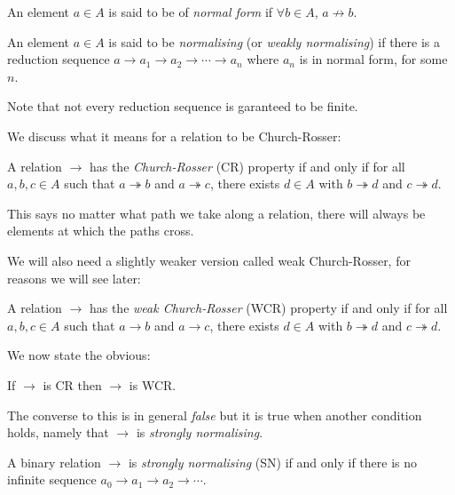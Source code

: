 \begin{defin}
    An element $a \in A$ is said to be of \emph{normal form} if $\forall b \in A$, $a {\not \to} b$.
\end{defin}

\begin{defin}
    An element $a \in A$ is said to be \emph{normalising} (or \emph{weakly normalising}) if there is a reduction sequence $a \to a_1 \to a_2 \to \cdots \to a_n$ where $a_n$ is in normal form, for some $n$.
\end{defin}

\begin{remark}
    Note that not every reduction sequence is garanteed to be finite.
\end{remark}

We discuss what it means for a relation to be Church-Rosser:

\begin{defin}
    A relation $\to$ has the \emph{Church-Rosser} (CR) property if and only if for all $a,b,c \in A$ such that $a \twoheadrightarrow b$ and $a \twoheadrightarrow c$, there exists $d \in A$ with $b \twoheadrightarrow d$ and $c \twoheadrightarrow d$.
\end{defin}

\begin{remark}
    This says no matter what path we take along a relation, there will always be elements at which the paths cross.
\end{remark}

We will also need a slightly weaker version called weak Church-Rosser, for reasons we will see later:

\begin{defin}
    A relation $\to$ has the \emph{weak Church-Rosser} (WCR) property if and only if for all $a, b, c \in A$ such that $a \to b$ and $a \to c$, there exists $d \in A$ with $b \twoheadrightarrow d$ and $c \twoheadrightarrow d$.
\end{defin}

We now state the obvious:

\begin{cor}\label{cr_is_wcr}
    If $\to$ is CR then $\to$ is WCR.
\end{cor}

The converse to this is in general \emph{false} but it is true when another condition holds, namely that $\to$ is \emph{strongly normalising}.

\begin{defin}
    A binary relation $\to$ is \emph{strongly normalising} (SN) if and only if there is no infinite sequence $a_0 \to a_1 \to a_2 \to  \cdots$.
\end{defin}

